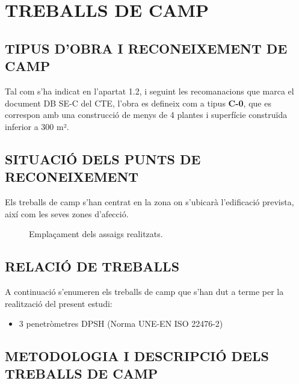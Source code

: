\documentclass{g3dt-report}
\begin{document}

\section{TREBALLS DE CAMP}

\subsection{TIPUS D'OBRA I RECONEIXEMENT DE CAMP}

Tal com s'ha indicat en l'apartat 1.2, i seguint les recomanacions que marca el document DB SE-C del CTE, l'obra es defineix com a tipus \textbf{C-0}, que es correspon amb una construcció de menys de 4 plantes i superfície construïda inferior a 300 m².

\subsection{SITUACIÓ DELS PUNTS DE RECONEIXEMENT}

Els treballs de camp s'han centrat en la zona on s'ubicarà l'edificació prevista, així com les seves zones d'afecció.

\begin{figure}[H]
\centering
{}
\caption{Emplaçament dels assaigs realitzats.}
\end{figure}

\subsection{RELACIÓ DE TREBALLS}

A continuació s'enumeren els treballs de camp que s'han dut a terme per la realització del present estudi:

\begin{itemize}
    \item 3 penetròmetres DPSH (Norma UNE-EN ISO 22476-2)
\end{itemize}

\subsection{METODOLOGIA I DESCRIPCIÓ DELS TREBALLS DE CAMP}
\end{document}
